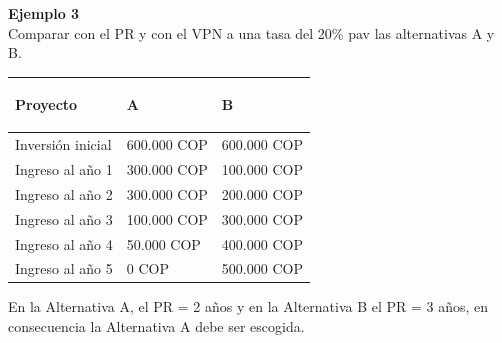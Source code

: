 \textbf{Ejemplo 3}\\
Comparar con el PR y con el VPN a una tasa del 20\% pav las alternativas A y B.

\begin{center}
	\begin{tabular}{ |p{3cm}|p{3cm}|p{3cm}| }
		\hline
		\rowcolor{white!50}              %
		\cellcolor[HTML]{FFB183}\begin{center}\textbf{Proyecto} \end{center} & \cellcolor[HTML]{FFB183}\begin{center} \textbf{A}\end{center} & \cellcolor[HTML]{FFB183}\begin{center} \textbf{B} \end{center} \\ \hline
		
		Inversión inicial          &   600.000 COP         &   600.000 COP         \\ \hline
		
		Ingreso al año 1           &   300.000 COP         &   100.000 COP          \\ \hline
		
		Ingreso al año 2           &   300.000 COP         &   200.000 COP          \\ \hline
		
		Ingreso al año 3           &   100.000 COP         &   300.000 COP         \\ \hline
		
		Ingreso al año 4           &   50.000  COP         &   400.000 COP         \\ \hline
		
		Ingreso al año 5           &   0 COP               &   500.000 COP         \\ \hline
	\end{tabular}
\end{center}

En la Alternativa A, el PR = 2 años y en la Alternativa B el PR = 3 años, en consecuencia la Alternativa A debe ser escogida. 


